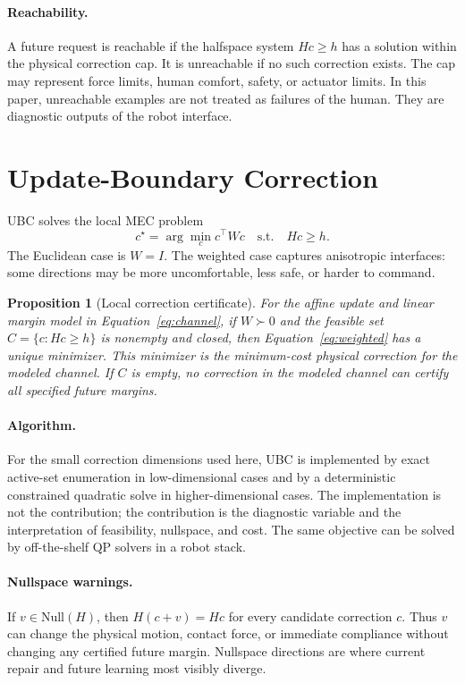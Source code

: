 \documentclass{article}
\newtheorem{proposition}{Proposition}
\begin{document}
\paragraph{Reachability.}
A future request is reachable if the halfspace system $Hc\ge h$ has a solution
within the physical correction cap. It is unreachable if no such correction
exists. The cap may represent force limits, human comfort, safety, or actuator
limits. In this paper, unreachable examples are not treated as failures of the
human. They are diagnostic outputs of the robot interface.

\section{Update-Boundary Correction}

UBC solves the local MEC problem
\begin{equation}
    c^\star = \arg\min_c c^\top W c
    \quad\textrm{s.t.}\quad Hc\ge h.
    \label{eq:weighted}
\end{equation}
The Euclidean case is $W=I$. The weighted case captures anisotropic interfaces:
some directions may be more uncomfortable, less safe, or harder to command.

\begin{proposition}[Local correction certificate]
For the affine update and linear margin model in Equation~\ref{eq:channel}, if
$W\succ0$ and the feasible set $C=\{c:Hc\ge h\}$ is nonempty and closed, then
Equation~\ref{eq:weighted} has a unique minimizer. This minimizer is the
minimum-cost physical correction for the modeled channel. If $C$ is empty, no
correction in the modeled channel can certify all specified future margins.
\end{proposition}

\paragraph{Algorithm.}
For the small correction dimensions used here, UBC is implemented by exact
active-set enumeration in low-dimensional cases and by a deterministic
constrained quadratic solve in higher-dimensional cases. The implementation is
not the contribution; the contribution is the diagnostic variable and the
interpretation of feasibility, nullspace, and cost. The same objective can be
solved by off-the-shelf QP solvers in a robot stack.

\paragraph{Nullspace warnings.}
If $v\in\mathrm{Null}(H)$, then $H(c+v)=Hc$ for every candidate correction $c$.
Thus $v$ can change the physical motion, contact force, or immediate compliance
without changing any certified future margin. Nullspace directions are where
current repair and future learning most visibly diverge.
\end{document}
